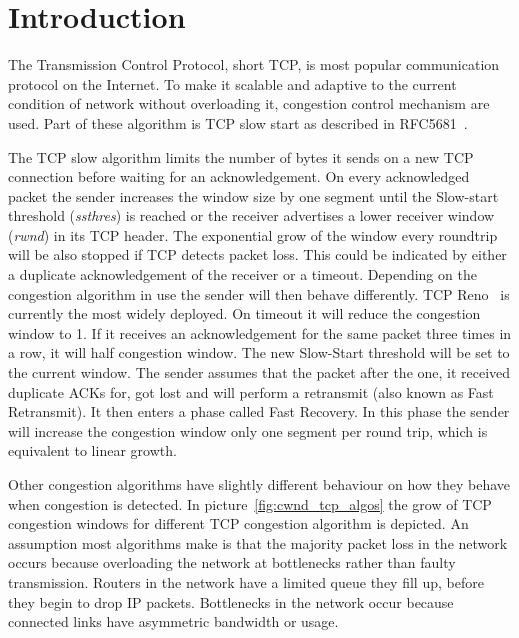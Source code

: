 \section{Introduction}
\label{sec:introduction}

The Transmission Control Protocol, short TCP, is most popular communication
protocol on the Internet. To make it scalable and adaptive to the current
condition of network without overloading it, congestion control mechanism are
used. Part of these algorithm is TCP slow start as described in
RFC5681~\cite{rfc5681}.

The TCP slow algorithm limits the number of bytes it sends on a new TCP
connection before waiting for an acknowledgement. On every acknowledged packet
the sender increases the window size by one segment until the Slow-start
threshold (\emph{ssthres}) is reached  or the receiver advertises a lower
receiver window (\emph{rwnd}) in its TCP header. The exponential grow of the
window every roundtrip will be also stopped if TCP detects packet loss. This
could be indicated by either a duplicate acknowledgement of the receiver or a
timeout. Depending on the congestion algorithm in use the sender will then
behave differently. TCP Reno~\cite{rfc2581} is currently the most widely
deployed. On timeout it will reduce the congestion window to 1. If it receives
an acknowledgement for the same packet three times in a row, it will half
congestion window. The new Slow-Start threshold will be set to the current
window. The sender assumes that the packet after the one, it received duplicate
ACKs for, got lost and will perform a retransmit (also known as Fast
Retransmit). It then enters a phase called Fast Recovery. In this phase the
sender will increase the congestion window only one segment per round trip,
which is equivalent to linear growth.

Other congestion algorithms have slightly different behaviour on how they behave
when congestion is detected. In picture~\ref{fig:cwnd_tcp_algos} the grow of TCP
congestion windows for different TCP congestion algorithm is depicted. An
assumption most algorithms make is that the majority packet loss in the network
occurs because overloading the network at bottlenecks rather than faulty
transmission. Routers in the network have a limited queue they fill up, before
they begin to drop IP packets. Bottlenecks in the network occur because
connected links have asymmetric bandwidth or usage.

